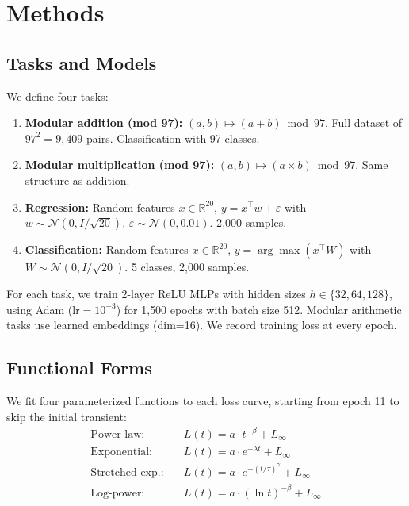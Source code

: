 \documentclass[11pt,a4paper]{article}
\begin{document}
\section{Methods}

\subsection{Tasks and Models}

We define four tasks:
\begin{enumerate}
    \item \textbf{Modular addition (mod 97):} $(a, b) \mapsto (a + b) \bmod 97$. Full dataset of $97^2 = 9{,}409$ pairs. Classification with 97 classes.
    \item \textbf{Modular multiplication (mod 97):} $(a, b) \mapsto (a \times b) \bmod 97$. Same structure as addition.
    \item \textbf{Regression:} Random features $x \in \mathbb{R}^{20}$, $y = x^\top w + \varepsilon$ with $w \sim \mathcal{N}(0, I/\sqrt{20})$, $\varepsilon \sim \mathcal{N}(0, 0.01)$. 2{,}000 samples.
    \item \textbf{Classification:} Random features $x \in \mathbb{R}^{20}$, $y = \arg\max(x^\top W)$ with $W \sim \mathcal{N}(0, I/\sqrt{20})$. 5 classes, 2{,}000 samples.
\end{enumerate}

For each task, we train 2-layer ReLU MLPs with hidden sizes $h \in \{32, 64, 128\}$, using Adam ($\text{lr}=10^{-3}$) for 1{,}500 epochs with batch size 512. Modular arithmetic tasks use learned embeddings (dim=16). We record training loss at every epoch.

\subsection{Functional Forms}

We fit four parameterized functions to each loss curve, starting from epoch 11 to skip the initial transient:
\begin{align}
    \text{Power law:} \quad & L(t) = a \cdot t^{-\beta} + L_\infty \\
    \text{Exponential:} \quad & L(t) = a \cdot e^{-\lambda t} + L_\infty \\
    \text{Stretched exp.:} \quad & L(t) = a \cdot e^{-(t/\tau)^\gamma} + L_\infty \\
    \text{Log-power:} \quad & L(t) = a \cdot (\ln t)^{-\beta} + L_\infty
\end{align}
\end{document}
